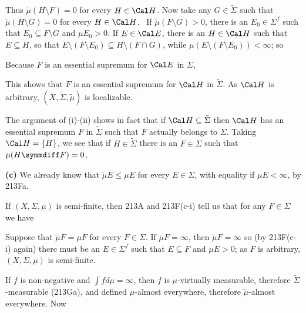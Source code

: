{\medskip

 Thus $\tilde\mu(H\setminus F)=0$ for every $H\in\Cal H$.
Now take any $G\in\tilde\Sigma$ such that $\tilde\mu(H\setminus G)=0$
for every $H\in\Cal H$.   \Quer\ If $\tilde\mu(F\setminus G)>0$, there
is an $E_0\in\Sigma^f$ such that $E_0\subseteq F\setminus G$ and
$\mu E_0>0$.   If $E\in\Cal E$, there is an
$H\in\Cal H$ such that $E\subseteq H$, so that
$E\setminus(F\setminus E_0)\subseteq H\setminus(F\cap G)$, while
$\mu(E\setminus(F\setminus E_0))<\infty$;  so


\noindent Because $F$ is an essential supremum for $\Cal E$ in $\Sigma$,


\noindent This shows that $F$ is an essential supremum for $\Cal H$ in
$\tilde\Sigma$.   As $\Cal H$ is arbitrary, $(X,\tilde\Sigma,\tilde\mu)$
is localizable.

\medskip

 The argument of (i)-(ii) shows in fact that if $\Cal
H\subseteq\tilde\Sigma$ then $\Cal H$ has an essential supremum $F$ in
$\tilde\Sigma$ such that $F$ actually belongs to $\Sigma$.   Taking
$\Cal H=\{H\}$, we see that if $H\in\tilde\Sigma$ there is an
$F\in\Sigma$ such that $\mu(H\symmdiff F)=0$.

\medskip

{\bf (c)} We already know that $\tilde\mu E\le\mu E$ for every
$E\in\Sigma$, with equality if $\mu E<\infty$, by 213Fa.

\medskip

 If $(X,\Sigma,\mu)$ is semi-finite, then 213A
and 213F(c-i) tell us that for any $F\in\Sigma$ we have


\medskip

 Suppose that $\tilde\mu F=\mu F$ for every $F\in\Sigma$.
If $\mu F=\infty$, then $\tilde\mu F=\infty$ so (by 213F(c-i) again)
there must be an $E\in\Sigma^f$ such that $E\subseteq F$ and
$\mu E>0$;  as $F$ is arbitrary, $(X,\Sigma,\mu)$ is
semi-finite.

\medskip

 If $f$ is non-negative and $\int fd\mu=\infty$, then
$f$ is $\mu$-virtually measurable, therefore $\tilde\Sigma$-measurable
(213Ga), and defined $\mu$-almost everywhere, therefore
$\tilde\mu$-almost everywhere.   Now

}
